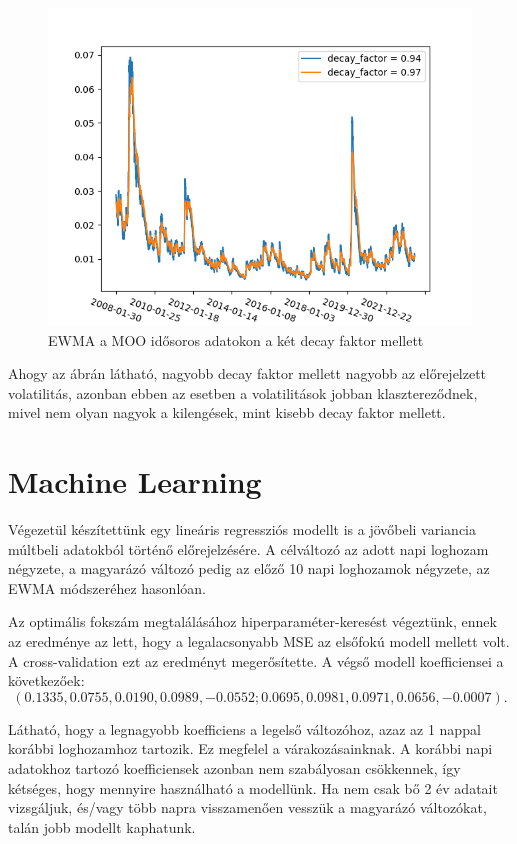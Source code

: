 \documentclass[12pt]{article}
\begin{document}
\begin{figure}[H]
	\centering
	\includegraphics[scale=0.8]{ewma}
	\caption{EWMA a MOO idősoros adatokon a két decay faktor mellett}
\end{figure}

Ahogy az ábrán látható, nagyobb decay faktor mellett nagyobb az előrejelzett volatilitás, azonban ebben az esetben a volatilitások jobban klasztereződnek, mivel nem olyan nagyok a kilengések, mint kisebb decay faktor mellett.


\section{Machine Learning}

Végezetül készítettünk egy lineáris regressziós modellt is a jövőbeli variancia múltbeli adatokból történő előrejelzésére. A célváltozó az adott napi loghozam négyzete, a magyarázó változó pedig az előző 10 napi loghozamok négyzete, az EWMA módszeréhez hasonlóan. 

Az optimális fokszám megtalálásához hiperparaméter-keresést végeztünk, ennek az eredménye az lett, hogy a legalacsonyabb MSE az elsőfokú modell mellett volt. A cross-validation ezt az eredményt megerősítette. A végső modell koefficiensei a következőek: 
$$(0.1335, 0.0755, 0.0190, 0.0989, -0.0552; 0.0695, 0.0981, 0.0971, 0.0656, -0.0007).$$

Látható, hogy a legnagyobb koefficiens a legelső változóhoz, azaz az 1 nappal korábbi loghozamhoz tartozik. Ez megfelel a várakozásainknak. A korábbi napi adatokhoz tartozó koefficiensek azonban nem szabályosan csökkennek, így kétséges, hogy mennyire használható a modellünk. Ha nem csak bő 2 év adatait vizsgáljuk, és/vagy több napra visszamenően vesszük a magyarázó változókat, talán jobb modellt kaphatunk.
\end{document}
